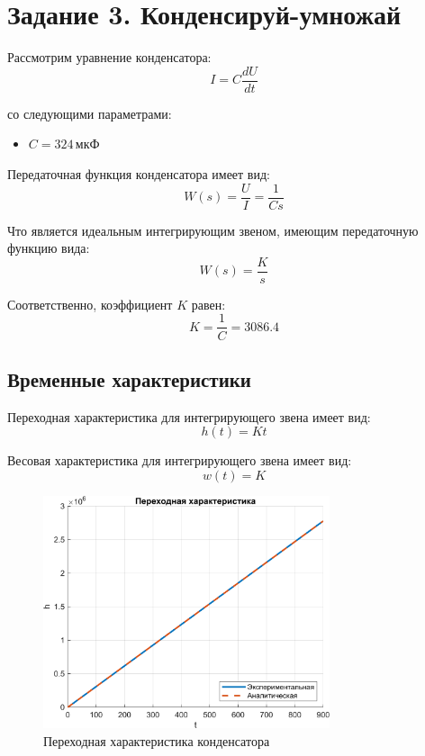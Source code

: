 \chapter{Задание 3. Конденсируй-умножай}

Рассмотрим уравнение конденсатора:
\[
    I = C \frac{dU}{dt}
\]  

со следующими параметрами:
\begin{itemize}
    \item[] \( C = 324 \, \text{мкФ} \)
\end{itemize}

Передаточная функция конденсатора имеет вид:
\[
    W(s) = \frac{U}{I} = \frac{1}{Cs}
\]

Что является идеальным интегрирующим звеном, имеющим передаточную функцию вида:
\[
    W(s) = \frac{K}{s}
\]

Соответственно, коэффициент \( K \) равен:
\[
    K = \frac{1}{C} = 3086.4
\]

\section{Временные характеристики}

Переходная характеристика для интегрирующего звена имеет вид:
\[
    h(t) = K t
\]

Весовая характеристика для интегрирующего звена имеет вид:
\[
    w(t) = K
\]

\begin{figure}[H]
    \centering
    \includegraphics[width=0.75\textwidth, trim={0cm 0cm 0cm 0cm}]{../images/3_1.png}
    \caption{Переходная характеристика конденсатора}
\end{figure}

